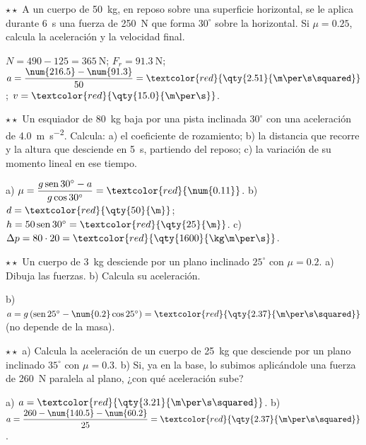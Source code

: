 \begin{exercise}
    \(\star\star\) A un cuerpo de \qty{50}{\kg}, en reposo sobre una superficie horizontal, se le aplica durante \qty{6}{\s} una fuerza
    de \qty{250}{\newton} que forma \(30^\circ\) sobre la horizontal. Si \(\mu = \num{0.25}\), calcula la aceleración y la velocidad final.
    \begin{solu}
        \(N = 490 - 125 = \qty{365}{\newton}\); \(F_r = \qty{91.3}{\newton}\); \(a = \dfrac{\num{216.5} - \num{91.3}}{50} =
        \textcolor{red}{\qty{2.51}{\m\per\s\squared}}\); \(v = \textcolor{red}{\qty{15.0}{\m\per\s}}\).
    \end{solu}
\end{exercise}

\begin{exercise}
    \(\star\star\) Un esquiador de \qty{80}{\kg} baja por una pista inclinada \(30^\circ\) con una aceleración de \qty{4.0}{\m\per\s\squared}.
    Calcula: a) el coeficiente de rozamiento; b) la distancia que recorre y la altura que desciende en \qty{5}{\s}, partiendo del reposo;
    c) la variación de su momento lineal en ese tiempo.
    \begin{solu}
        a) \(\mu = \dfrac{g\sen 30^\circ - a}{g\cos 30^\circ} = \textcolor{red}{\num{0.11}}\). b) \(d = \textcolor{red}{\qty{50}{\m}}\);
        \(h = 50\sen 30^\circ = \textcolor{red}{\qty{25}{\m}}\). c) \(\Delta p = 80 \cdot 20 = \textcolor{red}{\qty{1600}{\kg\m\per\s}}\).
    \end{solu}
\end{exercise}

\begin{exercise}
    \(\star\star\) Un cuerpo de \qty{3}{\kg} desciende por un plano inclinado \(25^\circ\) con \(\mu = \num{0.2}\). a) Dibuja las fuerzas.
    b) Calcula su aceleración.
    \begin{solu}
        b) \(a = g\,(\sen 25^\circ - \num{0.2}\cos 25^\circ) = \textcolor{red}{\qty{2.37}{\m\per\s\squared}}\) (no depende de la masa).
    \end{solu}
\end{exercise}

\begin{exercise}
    \(\star\star\) a) Calcula la aceleración de un cuerpo de \qty{25}{\kg} que desciende por un plano inclinado \(35^\circ\) con
    \(\mu = \num{0.3}\). b) Si, ya en la base, lo subimos aplicándole una fuerza de \qty{260}{\newton} paralela al plano, ¿con qué
    aceleración sube?
    \begin{solu}
        a) \(a = \textcolor{red}{\qty{3.21}{\m\per\s\squared}}\). b) \(a = \dfrac{260 - \num{140.5} - \num{60.2}}{25} = \textcolor{red}{\qty{2.37}{\m\per\s\squared}}\).
    \end{solu}
\end{exercise}

